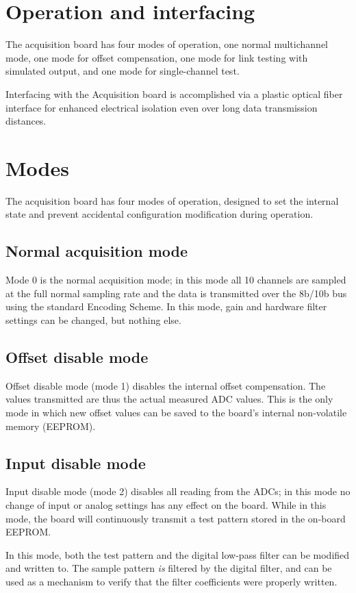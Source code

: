 \section{Operation and interfacing}

The acquisition board has four modes of operation, one normal
multichannel mode, one mode for offset compensation, one mode for link
testing with simulated output, and one mode for single-channel test.

Interfacing with the Acquisition board is accomplished via a plastic
optical fiber interface for enhanced electrical isolation even over
long data transmission distances.

\section{Modes}
The acquisition board has four modes of operation, designed to set the
internal state and prevent accidental configuration modification
during operation.

\subsection{Normal acquisition mode}
Mode 0 is the normal acquisition mode; in this mode all 10 channels
are sampled at the full normal sampling rate and the data is
transmitted over the 8b/10b bus using the standard Encoding Scheme. In
this mode, gain and hardware filter settings can be changed, but
nothing else.

\subsection{Offset disable mode}
Offset disable mode (mode 1)  disables the internal offset compensation. The
values transmitted are thus the actual measured ADC values. This is
the only mode in which new offset values can be saved to the board's
internal non-volatile memory (EEPROM).

\subsection{Input disable mode}
Input disable mode (mode 2) disables all reading from the ADCs; in
this mode no change of input or analog settings has any effect on the
board. While in this mode, the board will continuously transmit a test
pattern stored in the on-board EEPROM.

In this mode, both the test pattern and the digital low-pass filter
can be modified and written to. The sample pattern \textit{is} filtered by
the digital filter, and can be used as a mechanism to verify that the
filter coefficients were properly written.

